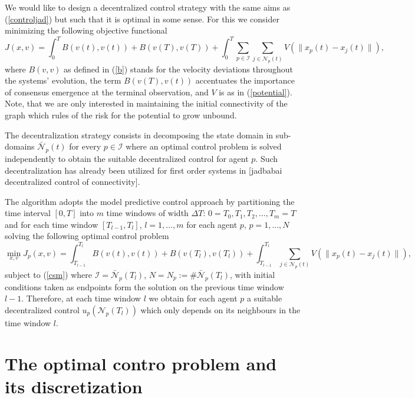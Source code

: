 \documentclass[a4paper,10pt, english]{article}
\begin{document}
We would like to design a decentralized control strategy with the same aims as (\ref{controljad}) but such that it is optimal in some sense. 
For this we consider minimizing the following objective functional 
\begin{equation}
J(x, v) = \int_{0}^{T}B(v(t), v(t)) + B(v(T), v(T)) + \int_{0}^{T}\sum_{p\in \mathcal{I}}\sum_{j\in \mathcal{N}_p(t)} V(\|x_p(t) - x_j(t)\|),
\label{Vt}
\end{equation}
where $B(v, v)$ as defined in (\ref{b})  stands for the velocity deviations throughout the systems' evolution, the term 
$B(v(T), v(t))$ accentuates the importance of consensus emergence at the terminal observation, and $V$ is as in (\ref{potential}).
Note, that we are only interested in maintaining the initial connectivity of the graph which rules of the risk for the potential to grow unbound.





The decentralization strategy consists in decomposing the state domain in sub-domains $\bar{\mathcal{N}}_p(t)$ for every $p\in \mathcal{I}$ where an optimal control problem is solved independently to obtain the suitable decentralized control for agent $p$. Such decentralization has already been utilized for first order systems in [jadbabai decentralized control of connectivity].

 The algorithm adopts the model predictive control approach by partitioning the time interval $[0, T]$ into $m$ time windows of width $\Delta T$: $0 = T_0, T_1, T_2, \dots, T_m = T$ and for each time window  $[T_{l-1}, T_{l}]$, $l = 1, \dots, m$ for each agent $p$, $p = 1, \dots, N$  solving the following optimal control problem
\begin{equation}
 \min_{x, v} J_p(x, v) = \int_{T_{l-1}}^{T_l}B(v(t), v(t)) + B(v(T_l), v(T_l)) + \int_{T_{l-1}}^{T_l}\sum_{j\in \mathcal{N}_p(t)} V(\|x_p(t) - x_j(t)\|),
\label{opci}
\end{equation}
subject to (\ref{csm}) where $\mathcal{I} = \bar{\mathcal{N}}_p(T_l)$,  $N = N_p:= \# \bar{\mathcal{N}}_p(T_l)$, with initial conditions taken as endpoints form the solution on the previous time window $l-1$.
Therefore, at each time window $l$ we obtain for each agent $p$ a suitable decentralized control $u_p(\mathcal{N}_p(T_l))$ which only depends on its neighbours in the time window $l$.
 
 
 \section{The optimal contro problem and its discretization}
\end{document}
